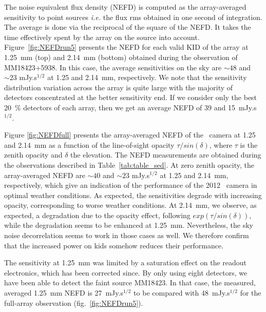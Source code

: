 The noise equivalent flux density (NEFD) is computed as the array-averaged
sensitivity to point sources {\it i.e.} the flux rms obtained in one second of
integration. The average is done via the reciprocal of the square of the
NEFD. It takes the time effectively spent by the array on
the source into account.\\
Figure~\ref{fig:NEFDrun5} presents the NEFD for each valid KID of the array at
1.25~mm (top) and 2.14~mm (bottom) obtained during the observation of
MM18423+5938.  In this case, the average sensitivities on the sky are $\sim
48$ and $\sim 23$ mJy.s$^{1/2}$ at 1.25 and 2.14~mm, respectively. We note that
the sensitivity distribution variation across the array is quite large with the majority of detectors concentrated at the better sensitivity end. If we consider only the best 20~\% detectors of each array,
  then we get an average NEFD of 39 and 15~mJy.s$^{1/2}$.
  

Figure \ref{fig:NEFDfull} presents the array-averaged NEFD of the \NIKA\ camera
at 1.25 and 2.14~mm as a function of the line-of-sight opacity $\tau/
sin(\delta)$, where $\tau$ is the zenith opacity and $\delta$ the
elevation. The NEFD measurements are  obtained during the
observations described in Table~\ref{tab:table_sed}.  At zero zenith opacity,
the array-averaged NEFD are $\sim 40$ and $\sim 23$ mJy.s$^{1/2}$ at
1.25 and 2.14~mm, respectively, which give an indication of the performance of the 2012
\NIKA\ camera in optimal weather conditions.  As expected, the sensitivities
degrade with increasing opacity, corresponding to worse weather conditions. At
2.14~mm, we observe, as expected, a degradation due to the opacity effect, following 
$exp(\tau/sin(\delta))$, while the degradation seems to be
enhanced at 1.25~mm. Nevertheless, the sky noise decorrelation seems to work  in those
cases as well. We therefore confirm that the increased power on kids somehow reduces
their performance.

The sensitivity at 1.25~mm was limited by a saturation effect on the
readout electronics, which has been corrected since. By only using eight
detectors, we have been able to detect  the faint source MM18423. In that
case, the measured, averaged 1.25~mm NEFD is 27~mJy.s$^{1/2}$ to be compared with 48~mJy.s$^{1/2}$ for the full-array observation 
(fig.~\ref{fig:NEFDrun5}). 


